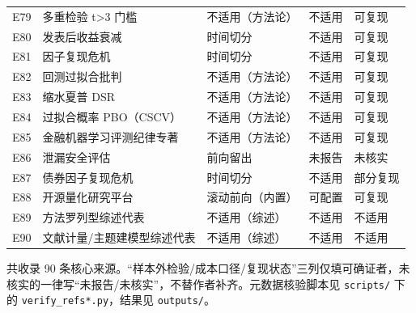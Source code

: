 {\begin{xltabular}{\textwidth}{@{}>{\raggedright\arraybackslash}p{0.7cm}>{\raggedright\arraybackslash}X>{\raggedright\arraybackslash}p{2.6cm}>{\raggedright\arraybackslash}p{2.4cm}>{\raggedright\arraybackslash}p{1.8cm}@{}}
E79 & 多重检验 t>3 门槛 & 不适用（方法论） & 不适用 & 可复现 \\
E80 & 发表后收益衰减 & 时间切分 & 不适用 & 可复现 \\
E81 & 因子复现危机 & 时间切分 & 不适用 & 可复现 \\
E82 & 回测过拟合批判 & 不适用（方法论） & 不适用 & 可复现 \\
E83 & 缩水夏普 DSR & 不适用（方法论） & 不适用 & 可复现 \\
E84 & 过拟合概率 PBO（CSCV） & 不适用（方法论） & 不适用 & 可复现 \\
E85 & 金融机器学习评测纪律专著 & 不适用（方法论） & 不适用 & 可复现 \\
E86 & 泄漏安全评估 & 前向留出 & 未报告 & 未核实 \\
E87 & 债券因子复现危机 & 时间切分 & 不适用 & 部分复现 \\
E88 & 开源量化研究平台 & 滚动前向（内置） & 可配置 & 可复现 \\
E89 & 方法罗列型综述代表 & 不适用（综述） & 不适用 & 不适用 \\
E90 & 文献计量/主题建模型综述代表 & 不适用（综述） & 不适用 & 不适用 \\
\bottomrule
\end{xltabular}
}

\noindent 共收录 90 条核心来源。“样本外检验/成本口径/复现状态”三列仅填可确证者，未核实的一律写“未报告/未核实”，不替作者补齐。元数据核验脚本见 \texttt{scripts/} 下的 \texttt{verify\_refs*.py}，结果见 \texttt{outputs/}。
